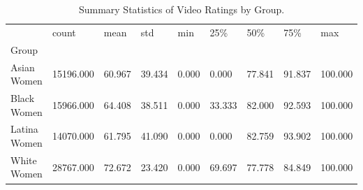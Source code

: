 \begin{table}[htbp]
\centering
\caption{Summary Statistics of Video Ratings by Group.}
\label{tab:eda_rating_stats}
\begin{tabular}{lllllllll}
\toprule
 & count & mean & std & min & 25\% & 50\% & 75\% & max \\
Group &  &  &  &  &  &  &  &  \\
\midrule
Asian Women & 15196.000 & 60.967 & 39.434 & 0.000 & 0.000 & 77.841 & 91.837 & 100.000 \\
Black Women & 15966.000 & 64.408 & 38.511 & 0.000 & 33.333 & 82.000 & 92.593 & 100.000 \\
Latina Women & 14070.000 & 61.795 & 41.090 & 0.000 & 0.000 & 82.759 & 93.902 & 100.000 \\
White Women & 28767.000 & 72.672 & 23.420 & 0.000 & 69.697 & 77.778 & 84.849 & 100.000 \\
\bottomrule
\end{tabular}

\end{table}